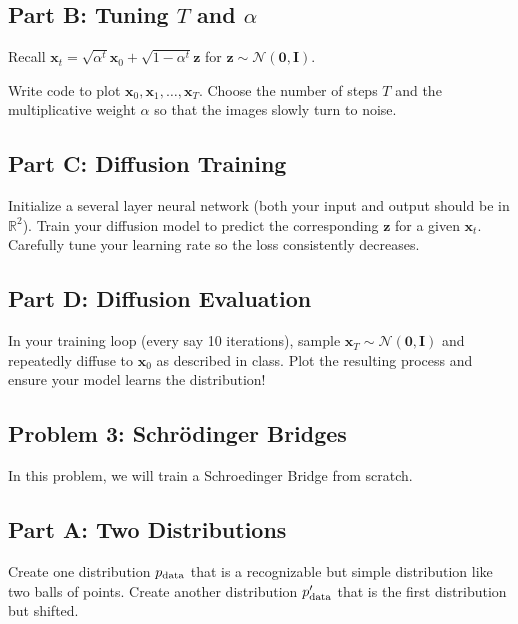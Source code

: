 \documentclass{article}
\begin{document}
\subsection*{Part B: Tuning $T$ and $\alpha$}

Recall $\mathbf{x}_t = \sqrt{\alpha^t} \mathbf{x}_0 + \sqrt{1- \alpha^t} \mathbf{z}$ for $\mathbf{z} \sim \mathcal{N}(\mathbf{0}, \mathbf{I})$.

Write code to plot $\mathbf{x}_0, \mathbf{x}_1, \ldots, \mathbf{x}_T$. Choose the number of steps $T$ and the multiplicative weight $\alpha$ so that the images slowly turn to noise.

\subsection*{Part C: Diffusion Training}

Initialize a several layer neural network (both your input and output should be in $\mathbb{R}^2$).
Train your diffusion model to predict the corresponding $\mathbf{z}$ for a given $\mathbf{x}_t$.
Carefully tune your learning rate so the loss consistently decreases.

\subsection*{Part D: Diffusion Evaluation}

In your training loop (every say 10 iterations), sample $\mathbf{x}_T \sim \mathcal{N}(\mathbf{0}, \mathbf{I})$ and repeatedly diffuse to $\mathbf{x}_0$ as described in class. Plot the resulting process and ensure your model learns the distribution!

%

\newpage

\subsection*{Problem 3: Schr\"{o}dinger Bridges}

In this problem, we will train a Schroedinger Bridge from scratch.

\subsection*{Part A: Two Distributions}

Create one distribution $p_{\textnormal{data}}$ that is a recognizable but simple distribution like two balls of points.
Create another distribution $p_{\textnormal{data}}'$ that is the first distribution but shifted.
\end{document}
